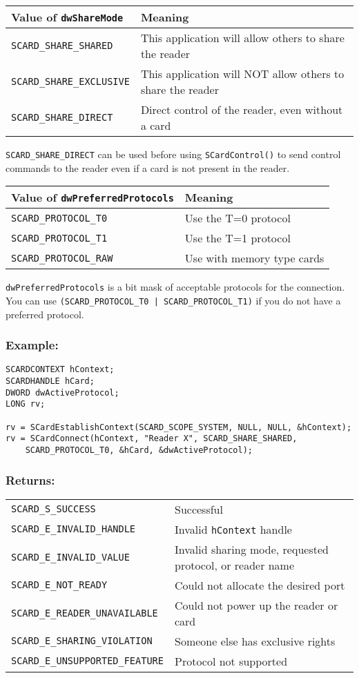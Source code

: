 \documentclass[a4paper,12pt]{article}
\newcommand{\example}{\subsubsection{Example:}}
\newcommand{\returns}{\subsubsection{Returns:}}
\begin{document}
\begin{tabular}{|l|l|}
\hline
Value of \texttt{dwShareMode} & Meaning\\
\hline
\hline
\texttt{SCARD\_SHARE\_SHARED} & This application will allow others to share the reader \\
\hline
\texttt{SCARD\_SHARE\_EXCLUSIVE} & This application will NOT allow
others to share the reader \\
\hline
\texttt{SCARD\_SHARE\_DIRECT} & Direct control of the reader, even
without a card \\
\hline
\end{tabular}

\texttt{SCARD\_SHARE\_DIRECT} can be used before using
\texttt{SCardControl()} to send control commands to the reader even if a
card is not present in the reader.

\begin{tabular}{|l|l|}
\hline
Value of \texttt{dwPreferredProtocols} & Meaning \\
\hline
\hline
\texttt{SCARD\_PROTOCOL\_T0} & Use the T=0 protocol \\
\hline
\texttt{SCARD\_PROTOCOL\_T1} & Use the T=1 protocol \\
\hline
\texttt{SCARD\_PROTOCOL\_RAW} & Use with memory type cards \\
\hline
\end{tabular}

\texttt{dwPreferredProtocols} is a bit mask of acceptable protocols for
the connection. You can use \texttt{(SCARD\_PROTOCOL\_T0 |
SCARD\_PROTOCOL\_T1)} if you do not have a preferred protocol.

\example

\begin{verbatim}
SCARDCONTEXT hContext;
SCARDHANDLE hCard;
DWORD dwActiveProtocol;
LONG rv;

rv = SCardEstablishContext(SCARD_SCOPE_SYSTEM, NULL, NULL, &hContext);
rv = SCardConnect(hContext, "Reader X", SCARD_SHARE_SHARED,
    SCARD_PROTOCOL_T0, &hCard, &dwActiveProtocol);
\end{verbatim}

\returns

\begin{tabular}{ll}
\texttt{SCARD\_S\_SUCCESS}  & Successful\\
\texttt{SCARD\_E\_INVALID\_HANDLE} & Invalid \texttt{hContext} handle\\
\texttt{SCARD\_E\_INVALID\_VALUE} & Invalid sharing mode, requested protocol, or reader name\\
\texttt{SCARD\_E\_NOT\_READY} & Could not allocate the desired port\\
\texttt{SCARD\_E\_READER\_UNAVAILABLE} & Could not power up the reader or card\\
\texttt{SCARD\_E\_SHARING\_VIOLATION} & Someone else has exclusive rights\\
\texttt{SCARD\_E\_UNSUPPORTED\_FEATURE} & Protocol not supported\\
\end{tabular}
\end{document}
